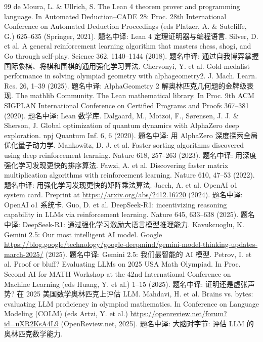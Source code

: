 \begin{thebibliography}{99}
 de Moura, L. \& Ullrich, S. The Lean 4 theorem prover and programming language. In Automated Deduction--CADE 28: Proc. 28th International Conference on Automated Deduction Proceedings (eds Platzer, A. \& Sutcliffe, G.) 625--635 (Springer, 2021). 题名中译: Lean 4 定理证明器与编程语言.
 Silver, D. et al. A general reinforcement learning algorithm that masters chess, shogi, and Go through self-play. Science 362, 1140--1144 (2018). 题名中译: 通过自我博弈掌握国际象棋、将棋和围棋的通用强化学习算法.
 Chervonyi, Y. et al. Gold-medalist performance in solving olympiad geometry with alphageometry2. J. Mach. Learn. Res. 26, 1--39 (2025). 题名中译: AlphaGeometry 2 解奥林匹克几何题的金牌级表现.
 The mathlib Community. The Lean mathematical library. In Proc. 9th ACM SIGPLAN International Conference on Certified Programs and Proofs 367--381 (2020). 题名中译: Lean 数学库.
 Dalgaard, M., Motzoi, F., Sørensen, J. J. \& Sherson, J. Global optimization of quantum dynamics with AlphaZero deep exploration. npj Quantum Inf. 6, 6 (2020). 题名中译: 用 AlphaZero 深度探索全局优化量子动力学.
 Mankowitz, D. J. et al. Faster sorting algorithms discovered using deep reinforcement learning. Nature 618, 257--263 (2023). 题名中译: 用深度强化学习发现更快的排序算法.
 Fawzi, A. et al. Discovering faster matrix multiplication algorithms with reinforcement learning. Nature 610, 47--53 (2022). 题名中译: 用强化学习发现更快的矩阵乘法算法.
 Jaech, A. et al. OpenAI o1 system card. Preprint at \url{https://arxiv.org/abs/2412.16720} (2024). 题名中译: OpenAI o1 系统卡.
 Guo, D. et al. DeepSeek-R1: incentivizing reasoning capability in LLMs via reinforcement learning. Nature 645, 633--638 (2025). 题名中译: DeepSeek-R1: 通过强化学习激励大语言模型推理能力.
 Kavukcuoglu, K. Gemini 2.5: Our most intelligent AI model. Google \url{https://blog.google/technology/google-deepmind/gemini-model-thinking-updates-march-2025/} (2025). 题名中译: Gemini 2.5: 我们最智能的 AI 模型.
 Petrov, I. et al. Proof or bluff? Evaluating LLMs on 2025 USA Math Olympiad. In Proc. Second AI for MATH Workshop at the 42nd International Conference on Machine Learning (eds Huang, Y. et al.) 1--15 (2025). 题名中译: 证明还是虚张声势? 在 2025 美国数学奥林匹克上评估 LLM.
 Mahdavi, H. et al. Brains vs. bytes: evaluating LLM proficiency in olympiad mathematics. In Conference on Language Modeling (COLM) (eds Artzi, Y. et al.) \url{https://openreview.net/forum?id=uXR2KsA4L9} (OpenReview.net, 2025). 题名中译: 大脑对字节: 评估 LLM 的奥林匹克数学能力.

\end{thebibliography}

